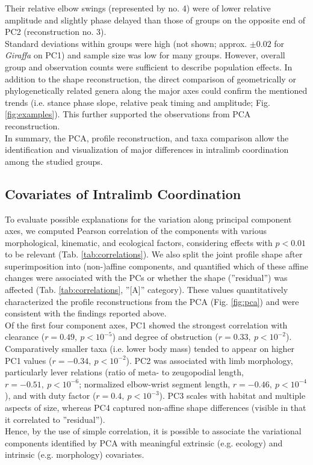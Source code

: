 Their relative elbow swings (represented by no. 4) were of lower relative amplitude and slightly phase delayed than those of groups on the opposite end of PC2 (reconstruction no. 3).
\\Standard deviations within groups were high (not shown; approx. $\pm 0.02$ for \textit{Giraffa} on PC1) and sample size was low for many groups.
However, overall group and observation counts were sufficient to describe population effects.
In addition to the shape reconstruction, the direct comparison of geometrically or phylogenetically related genera along the major axes could confirm the mentioned trends (i.e. stance phase slope, relative peak timing and amplitude; Fig. \ref*{fig:examples}).
This further supported the observations from PCA reconstruction.
\\In summary, the PCA, profile reconstruction, and taxa comparison allow the identification and visualization of major differences in intralimb coordination among the studied groups.


\subsection{Covariates of Intralimb Coordination}


To evaluate possible explanations for the variation along principal component axes, we computed Pearson correlation of the components with various morphological, kinematic, and ecological factors, considering effects with $p<0.01$ to be relevant (Tab. \ref{tab:correlations}).
We also split the joint profile shape after superimposition into (non-)affine components, and quantified which of these affine changes were associated with the PCs or whether the shape (''residual'') was affected (Tab. \ref{tab:correlations}, ''[A]'' category).
These values quantitatively characterized the profile reconstructions from the PCA (Fig. \ref{fig:pca}) and were consistent with the findings reported above.
\\Of the first four component axes, PC1 showed the strongest correlation with clearance ($r = 0.49,\ p < 10^{-5}$) and degree of obstruction ($r = 0.33,\ p < 10^{-2}$).
Comparatively smaller taxa (i.e. lower body mass) tended to appear on higher PC1 values ($r = -0.34,\ p < 10^{-2}$).
PC2 was associated with limb morphology, particularly lever relations (ratio of meta- to zeugopodial length, $r = -0.51,\ p < 10^{-6}$; normalized elbow-wrist segment length, $r = -0.46,\ p < 10^{-4}$), and with duty factor ($r = 0.4,\ p < 10^{-3}$).
PC3 scales with habitat and multiple aspects of size, whereas PC4 captured non-affine shape differences (visible in that it correlated to ''residual'').
\\Hence, by the use of simple correlation, it is possible to associate the variational components identified by PCA with meaningful extrinsic (e.g. ecology) and intrinsic (e.g. morphology) covariates.



